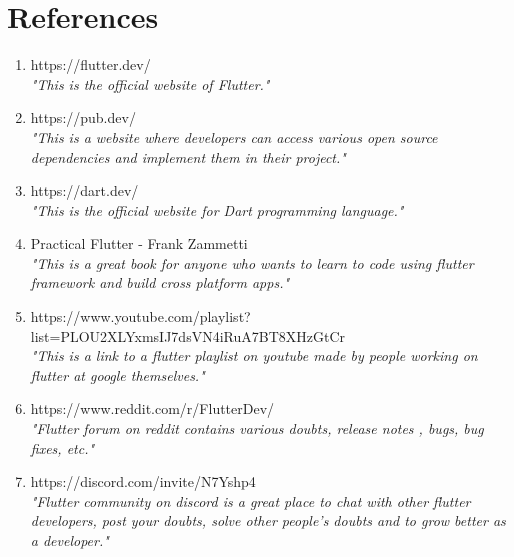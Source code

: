 \documentclass[12pt,a4wide]{report}
\theoremstyle{plain}
\theoremstyle{definition}
\theoremstyle{remark}
\begin{document}






\setcounter{page}{1}


















\nocite{*}



\chapter{References}
\begin{enumerate}

\item https://flutter.dev/\\
{\em "This is the official website of Flutter."}

\item https://pub.dev/\\
{\em "This is a website where developers can access various open source dependencies and implement them in their project."}

\item https://dart.dev/\\
{\em "This is the official website for Dart programming language."}

\item Practical Flutter - Frank Zammetti\\
{\em "This is a great book for anyone who wants to learn to code using flutter framework and build cross platform apps."}

\item https://www.youtube.com/playlist?list=PLOU2XLYxmsIJ7dsVN4iRuA7BT8XHzGtCr\\
{\em "This is a link to a flutter playlist on youtube made by people working on flutter at google themselves."}

\item https://www.reddit.com/r/FlutterDev/\\
{\em "Flutter forum on reddit contains various doubts, release notes , bugs, bug fixes, etc."}

\item https://discord.com/invite/N7Yshp4\\
{\em "Flutter community on discord is a great place to chat with other flutter developers, post your doubts, solve other people's doubts and to grow better as a developer."}

\end{enumerate}
\end{document}
